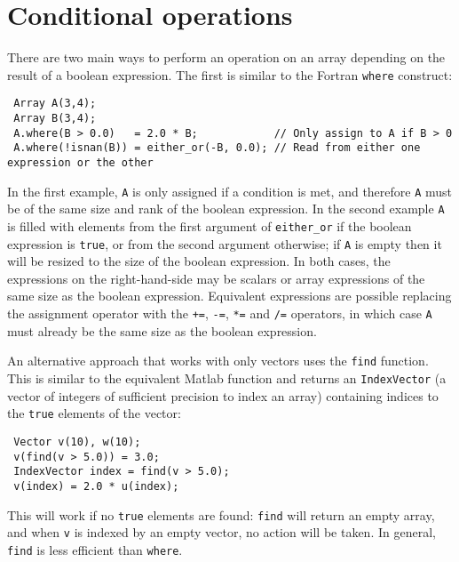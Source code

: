 \documentclass[a4,oneside]{book}
\def\codesize{\small}
\def\code#1{{\codesize\texttt{#1}}}
\begin{document}
\section{Conditional operations}
\label{sec:conditional}
There are two main ways to perform an operation on an array depending
on the result of a boolean expression. The first is similar to the
Fortran \code{where} construct:
\begin{lstlisting}
 Array A(3,4);
 Array B(3,4);
 A.where(B > 0.0)   = 2.0 * B;            // Only assign to A if B > 0
 A.where(!isnan(B)) = either_or(-B, 0.0); // Read from either one expression or the other
\end{lstlisting}
In the first example, \code{A} is only assigned if a condition is met,
and therefore \code{A} must be of the same size and rank of the
boolean expression. In the second example \code{A} is filled with
elements from the first argument of \code{either\_or} if the boolean
expression is \code{true}, or from the second argument otherwise; if
\code{A} is empty then it will be resized to the size of the boolean
expression. In both cases, the expressions on the right-hand-side may
be scalars or array expressions of the same size as the boolean
expression.  Equivalent expressions are possible replacing the
assignment operator with the \code{+=}, \code{-=}, \code{*=} and
\code{/=} operators, in which case \code{A} must already be the same
size as the boolean expression.

An alternative approach that works with only vectors uses the
\code{find} function. This is similar to the equivalent Matlab
function and returns an \code{IndexVector} (a vector of integers of
sufficient precision to index an array) containing indices to the
\code{true} elements of the vector:
\begin{lstlisting}
 Vector v(10), w(10);
 v(find(v > 5.0)) = 3.0;
 IndexVector index = find(v > 5.0);
 v(index) = 2.0 * u(index);
\end{lstlisting}
This will work if no \code{true} elements are found: \code{find} will
return an empty array, and when \code{v} is indexed by an empty
vector, no action will be taken.  In general, \code{find} is less
efficient than \code{where}.
\end{document}
